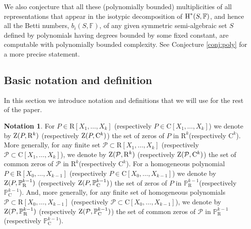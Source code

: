 \documentclass{amsart}
\theoremstyle{definition}
\newtheorem{notation}{Notation}
\theoremstyle{remark}
\numberwithin{equation}{section}
\begin{document}
We also conjecture that 
all these (polynomially bounded) multiplicities of all representations that appear in the
isotypic decomposition of ${\mbox{\rm H}}^*(S,{\mathbb{F}})$,
and hence all the Betti numbers, $b_i(S,{\mathbb{F}})$,
of any given symmetric semi-algebraic set $S$ defined by polynomials having degrees bounded by
some fixed constant, are computable with polynomially bounded complexity. 
See Conjecture \ref{conj:poly} for a more precise statement.

\subsection{Basic notation and definition}
\label{subsec:basic-notation-definition}
In this section we introduce notation and definitions that we will use for the rest of the paper.

\begin{notation}
\label{not:zeros}
  For $P \in {\mathrm{R}} [X_{1} , \ldots ,X_{k}]$ (respectively $P \in {\mathrm{C}} [ X_{1} ,
  \ldots ,X_{k} ]$) we denote by ${{\rm Z}}(P, {\mathrm{R}}^{k})$ (respectively
  ${{\rm Z}} (P, {\mathrm{C}}^{k})$) the set of zeros of $P$ in
  ${\mathrm{R}}^{k}$(respectively ${\mathrm{C}}^{k}$). More generally, for any finite set
  $\mathcal{P} \subset {\mathrm{R}} [ X_{1} , \ldots ,X_{k} ]$ (respectively
  $\mathcal{P} \subset {\mathrm{C}} [ X_{1} , \ldots ,X_{k} ]$), we denote by ${{\rm Z}}
  (\mathcal{P}, {\mathrm{R}}^{k})$ (respectively ${{\rm Z}} (\mathcal{P},
  {\mathrm{C}}^{k})$) the set of common zeros of $\mathcal{P}$ in
  ${\mathrm{R}}^{k}$(respectively ${\mathrm{C}}^{k}$).  For a homogeneous polynomial $P \in {\mathrm{R}} [X_{0} , \ldots ,X_{k-1}]$ (respectively $P \in {\mathrm{C}} [ X_{0} ,
  \ldots ,X_{k-1} ]$)   we denote by ${{\rm Z}}(P, {\mathbb{P}}_{\mathrm{R}}^{k-1})$ (respectively
  ${{\rm Z}} (P, {\mathbb{P}}_{\mathrm{C}}^{k-1})$) the set of zeros of $P$ in
  ${\mathbb{P}}_{\mathrm{R}}^{k-1}$(respectively ${\mathbb{P}}_{\mathrm{C}}^{k-1}$). And, more generally, for any finite set of 
  homogeneous polynomials
  $\mathcal{P} \subset {\mathrm{R}} [ X_{0} , \ldots ,X_{k-1} ]$ (respectively
  $\mathcal{P} \subset {\mathrm{C}} [ X_{0} , \ldots ,X_{k-1} ]$), we denote by ${{\rm Z}}
  (\mathcal{P}, {\mathbb{P}}_{\mathrm{R}}^{k-1})$ (respectively ${{\rm Z}} (\mathcal{P},
  {\mathbb{P}}_{\mathrm{C}}^{k-1})$) the set of common zeros of $\mathcal{P}$ in
  ${\mathbb{P}}_{\mathrm{R}}^{k-1}$ (respectively ${\mathbb{P}}_{\mathrm{C}}^{k-1}$). 
\end{notation}
\end{document}
